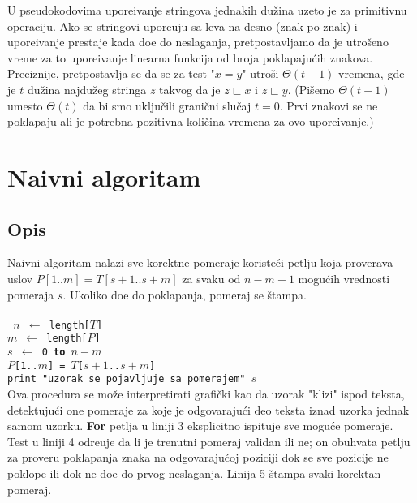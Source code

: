 \documentclass[a4paper,12pt]{article}
\begin{document}
U pseudokodovima upore\dj ivanje stringova jednakih du\v zina uzeto je za primitivnu operaciju. Ako se stringovi upore\dj uju sa leva na desno (znak po znak) i upore\dj ivanje prestaje kada do\dj e do neslaganja, pretpostavljamo da je utro\v seno vreme za to upore\dj ivanje linearna funkcija od broja poklapaju\' cih znakova. Preciznije, pretpostavlja se da se za test "$x = y$" utro\v si $\Theta(t+1)$ vremena, gde je $t$ du\v zina najdu\v zeg stringa $z$ takvog da je $z \sqsubset x$ i $z \sqsubset y$. (Pi\v semo $\Theta(t+1)$ umesto $\Theta(t)$ da bi smo uklju\v cili grani\v cni slu\v caj $t = 0$. Prvi znakovi se ne poklapaju ali je potrebna pozitivna koli\v cina vremena za ovo upore\dj ivanje.)


\section{Naivni algoritam}

\subsection{Opis}

Naivni algoritam nalazi sve korektne pomeraje koriste\' ci petlju koja proverava uslov $P[1..m] = T[s + 1 .. s + m]$ za svaku od $n - m + 1$ mogu\' cih vrednosti pomeraja $s$. Ukoliko do\dj e do poklapanja, pomeraj se \v stampa.
\\

 \\
\texttt{
 \quad $n$ $\leftarrow$ length[$T$] \\
 \quad $m$ $\leftarrow$ length[$P$] \\
  $s$ $\leftarrow$ 0 {\bf to} $n - m$ \\
 \quad {} $P$[1..$m$] = $T$[$s + 1$..$s + m$] \\
 \quad \indent {} print "uzorak se pojavljuje sa pomerajem" $s$
}
\\

Ova procedura se mo\v ze interpretirati grafi\v cki kao da uzorak "klizi" ispod teksta, detektuju\' ci one pomeraje za koje je odgovaraju\' ci deo teksta iznad uzorka jednak samom uzorku. {\bf For} petlja u liniji 3 eksplicitno ispituje sve mogu\' ce pomeraje. Test u liniji 4 odre\dj uje da li je trenutni pomeraj validan ili ne; on obuhvata petlju za proveru poklapanja znaka na odgovaraju\' coj poziciji dok se sve pozicije ne poklope ili dok ne do\dj e do prvog neslaganja. Linija 5 \v stampa svaki korektan pomeraj.
\\
\end{document}

